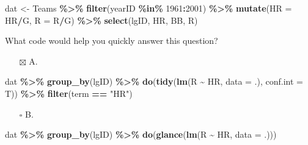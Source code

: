 \documentclass[
]{article}
\newenvironment{Shaded}{\begin{snugshade}}{\end{snugshade}}
\newcommand{\DataTypeTok}[1]{\textcolor[rgb]{0.13,0.29,0.53}{#1}}
\newcommand{\DecValTok}[1]{\textcolor[rgb]{0.00,0.00,0.81}{#1}}
\newcommand{\KeywordTok}[1]{\textcolor[rgb]{0.13,0.29,0.53}{\textbf{#1}}}
\newcommand{\NormalTok}[1]{#1}
\newcommand{\OperatorTok}[1]{\textcolor[rgb]{0.81,0.36,0.00}{\textbf{#1}}}
\newcommand{\StringTok}[1]{\textcolor[rgb]{0.31,0.60,0.02}{#1}}
\providecommand{\tightlist}{%
  \setlength{\itemsep}{0pt}\setlength{\parskip}{0pt}}
\begin{document}
\begin{Shaded}
\begin{Highlighting}[]
\NormalTok{dat \textless{}{-}}\StringTok{ }\NormalTok{Teams }\OperatorTok{\%\textgreater{}\%}\StringTok{ }\KeywordTok{filter}\NormalTok{(yearID }\OperatorTok{\%in\%}\StringTok{ }\DecValTok{1961}\OperatorTok{:}\DecValTok{2001}\NormalTok{) }\OperatorTok{\%\textgreater{}\%}
\StringTok{  }\KeywordTok{mutate}\NormalTok{(}\DataTypeTok{HR =}\NormalTok{ HR}\OperatorTok{/}\NormalTok{G,}
         \DataTypeTok{R =}\NormalTok{ R}\OperatorTok{/}\NormalTok{G) }\OperatorTok{\%\textgreater{}\%}
\StringTok{  }\KeywordTok{select}\NormalTok{(lgID, HR, BB, R)}
\end{Highlighting}
\end{Shaded}

What code would help you quickly answer this question?

\begin{itemize}
\tightlist
\item[$\boxtimes$]
  A.
\end{itemize}

\begin{Shaded}
\begin{Highlighting}[]
\NormalTok{dat }\OperatorTok{\%\textgreater{}\%}\StringTok{ }
\StringTok{  }\KeywordTok{group\_by}\NormalTok{(lgID) }\OperatorTok{\%\textgreater{}\%}\StringTok{ }
\StringTok{  }\KeywordTok{do}\NormalTok{(}\KeywordTok{tidy}\NormalTok{(}\KeywordTok{lm}\NormalTok{(R }\OperatorTok{\textasciitilde{}}\StringTok{ }\NormalTok{HR, }\DataTypeTok{data =}\NormalTok{ .), }\DataTypeTok{conf.int =}\NormalTok{ T)) }\OperatorTok{\%\textgreater{}\%}\StringTok{ }
\StringTok{  }\KeywordTok{filter}\NormalTok{(term }\OperatorTok{==}\StringTok{ "HR"}\NormalTok{)}
\end{Highlighting}
\end{Shaded}

\begin{itemize}
\tightlist
\item[$\square$]
  B.
\end{itemize}

\begin{Shaded}
\begin{Highlighting}[]
\NormalTok{dat }\OperatorTok{\%\textgreater{}\%}\StringTok{ }
\StringTok{  }\KeywordTok{group\_by}\NormalTok{(lgID) }\OperatorTok{\%\textgreater{}\%}\StringTok{ }
\StringTok{  }\KeywordTok{do}\NormalTok{(}\KeywordTok{glance}\NormalTok{(}\KeywordTok{lm}\NormalTok{(R }\OperatorTok{\textasciitilde{}}\StringTok{ }\NormalTok{HR, }\DataTypeTok{data =}\NormalTok{ .)))}
\end{Highlighting}
\end{Shaded}
\end{document}
